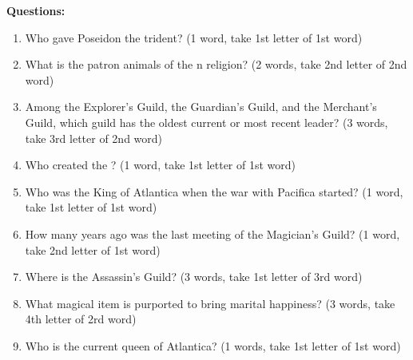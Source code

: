 \documentclass[green]{NeptuneBall}
\begin{document}
{\bf Questions:}
\begin{enumerate}
 \item Who gave Poseidon the trident? (1 word, take 1st letter of 1st word) \vspace{3 mm}\\  \underline{\hspace{15cm}}
 \item What is the patron animals of the \pAtlantis{}n religion? (2 words, take 2nd letter of 2nd word) \vspace{3 mm}\\ \underline{\hspace{15cm}}
	\item Among the Explorer's Guild, the Guardian's Guild, and the Merchant's Guild, which guild has the oldest current or most recent leader? (3 words, take 3rd letter of 2nd word) \vspace{3 mm}\\ \underline{\hspace{15cm}}
	\item Who created the \sArtifactTwo{}? (1 word, take 1st letter of 1st word) \vspace{3 mm}\\ \underline{\hspace{15cm}}
	\item Who was the King of Atlantica when the war with Pacifica started? (1 word, take 1st letter of 1st word) \vspace{3 mm}\\ \underline{\hspace{15cm}}
	\item How many years ago was the last meeting of the Magician's Guild? (1 word, take 2nd letter of 1st word) \vspace{3 mm}\\ \underline{\hspace{15cm}}
	\item Where is the Assassin's Guild? (3 words, take 1st letter of 3rd word) \vspace{3 mm}\\ \underline{\hspace{15cm}}
	\item What magical item is purported to bring marital happiness? (3 words, take 4th letter of 2rd word) \vspace{3 mm}\\ \underline{\hspace{15cm}}
	\item Who is the current queen of Atlantica? (1 words, take 1st letter of 1st word) \vspace{3 mm}\\ \underline{\hspace{15cm}}

\end{enumerate}
\end{document}
